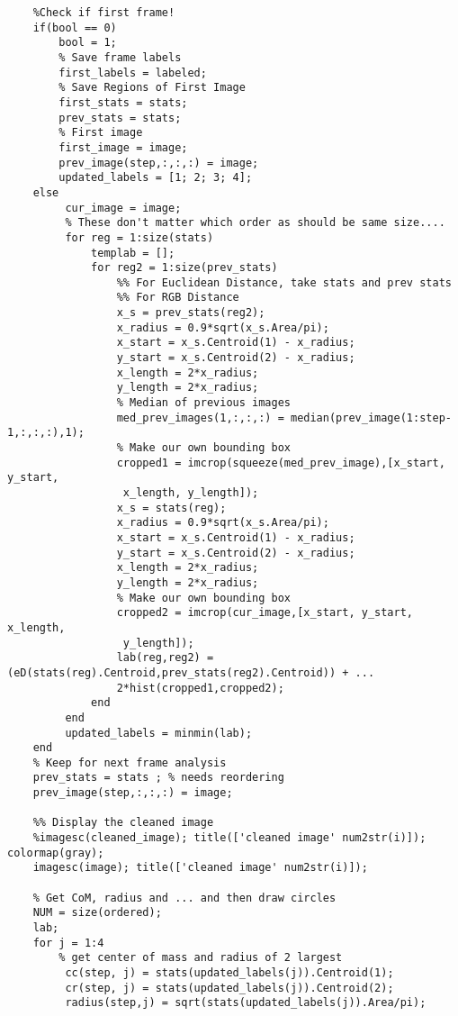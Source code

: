 \documentclass{article}
\begin{document}
\begin{lstlisting}
    %Check if first frame!
    if(bool == 0)
        bool = 1;
        % Save frame labels
        first_labels = labeled;
        % Save Regions of First Image
        first_stats = stats;
        prev_stats = stats;
        % First image
        first_image = image;
        prev_image(step,:,:,:) = image;
        updated_labels = [1; 2; 3; 4];
    else 
         cur_image = image;
         % These don't matter which order as should be same size....
         for reg = 1:size(stats)
             templab = [];
             for reg2 = 1:size(prev_stats)
                 %% For Euclidean Distance, take stats and prev stats
                 %% For RGB Distance
                 x_s = prev_stats(reg2);
                 x_radius = 0.9*sqrt(x_s.Area/pi);
                 x_start = x_s.Centroid(1) - x_radius;
                 y_start = x_s.Centroid(2) - x_radius;
                 x_length = 2*x_radius;
                 y_length = 2*x_radius;
                 % Median of previous images
                 med_prev_images(1,:,:,:) = median(prev_image(1:step-1,:,:,:),1);
                 % Make our own bounding box
                 cropped1 = imcrop(squeeze(med_prev_image),[x_start, y_start,
                  x_length, y_length]);
                 x_s = stats(reg);
                 x_radius = 0.9*sqrt(x_s.Area/pi);
                 x_start = x_s.Centroid(1) - x_radius;
                 y_start = x_s.Centroid(2) - x_radius;
                 x_length = 2*x_radius;
                 y_length = 2*x_radius;
                 % Make our own bounding box  
                 cropped2 = imcrop(cur_image,[x_start, y_start, x_length,
                  y_length]);
                 lab(reg,reg2) = (eD(stats(reg).Centroid,prev_stats(reg2).Centroid)) + ... 
                 2*hist(cropped1,cropped2);    
             end
         end      
         updated_labels = minmin(lab);
    end
    % Keep for next frame analysis
    prev_stats = stats ; % needs reordering
    prev_image(step,:,:,:) = image;
    
    %% Display the cleaned image
    %imagesc(cleaned_image); title(['cleaned image' num2str(i)]); colormap(gray);
    imagesc(image); title(['cleaned image' num2str(i)]);
    
    % Get CoM, radius and ... and then draw circles
    NUM = size(ordered);
    lab;
    for j = 1:4    
        % get center of mass and radius of 2 largest
         cc(step, j) = stats(updated_labels(j)).Centroid(1);
         cr(step, j) = stats(updated_labels(j)).Centroid(2);
         radius(step,j) = sqrt(stats(updated_labels(j)).Area/pi);


\end{lstlisting}
\end{document}

